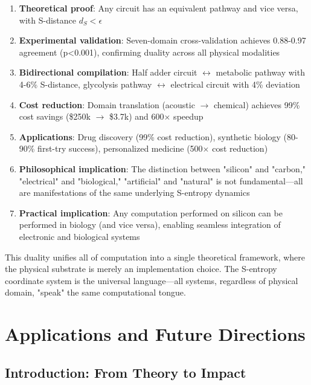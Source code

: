 \documentclass[11pt,a4paper]{article}
\begin{document}
\begin{enumerate}
\item \textbf{Theoretical proof}: Any circuit has an equivalent pathway and vice versa, with S-distance $d_S < \epsilon$

\item \textbf{Experimental validation}: Seven-domain cross-validation achieves 0.88-0.97 agreement (p<0.001), confirming duality across all physical modalities

\item \textbf{Bidirectional compilation}: Half adder circuit $\leftrightarrow$ metabolic pathway with 4-6\% S-distance, glycolysis pathway $\leftrightarrow$ electrical circuit with 4\% deviation

\item \textbf{Cost reduction}: Domain translation (acoustic $\to$ chemical) achieves 99\% cost savings (\$250k $\to$ \$3.7k) and 600$\times$ speedup

\item \textbf{Applications}: Drug discovery (99\% cost reduction), synthetic biology (80-90\% first-try success), personalized medicine (500$\times$ cost reduction)

\item \textbf{Philosophical implication}: The distinction between "silicon" and "carbon," "electrical" and "biological," "artificial" and "natural" is not fundamental—all are manifestations of the same underlying S-entropy dynamics

\item \textbf{Practical implication}: Any computation performed on silicon can be performed in biology (and vice versa), enabling seamless integration of electronic and biological systems
\end{enumerate}

This duality unifies all of computation into a single theoretical framework, where the physical substrate is merely an implementation choice. The S-entropy coordinate system is the universal language—all systems, regardless of physical domain, "speak" the same computational tongue.

\clearpage

\section{Applications and Future Directions}

\subsection{Introduction: From Theory to Impact}
\end{document}
